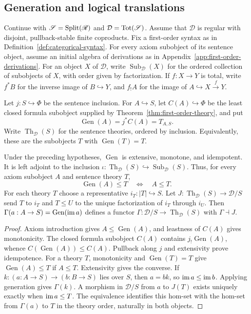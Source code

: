 \subsection{Generation and logical translations}
\label{sec:internal-adjunctions}

Continue with $\mathscr S=\operatorname{Split}(\mathscr R)$ and
$\mathcal D=\operatorname{Tot}(\mathscr S)$. Assume that $\mathcal D$ is regular
with disjoint, pullback-stable finite coproducts. Fix a first-order
syntax as in Definition~\ref{def:categorical-syntax}. For every
axiom subobject of its sentence object, assume an initial algebra
of derivations as in Appendix~\ref{app:first-order-derivations}. For an object $X$ of $\mathcal D$, write
$\operatorname{Sub}_{\mathcal D}(X)$ for the ordered collection of
subobjects of $X$, with order given by factorization. If
$f:X\to Y$ is total, write $f^*B$ for the inverse image of
$B\hookrightarrow Y$, and $f_!A$ for the image of
$A\hookrightarrow X\xrightarrow{f}Y$.

Let $j:S\hookrightarrow\Phi$ be the sentence inclusion. For
$A\hookrightarrow S$, let $C(A)\hookrightarrow\Phi$ be the least
closed formula subobject supplied by
Theorem~\ref{thm:first-order-theory}, and put
\[
 \operatorname{Gen}(A)=j^*C(A)=T_{A,S}.
\]
Write $\operatorname{Th}_{\mathcal D}(S)$ for the sentence theories,
ordered by inclusion. Equivalently, these are the subobjects $T$ with
$\operatorname{Gen}(T)=T$.

\begin{theorem}\label{thm:first-order-reflection}
Under the preceding hypotheses, $\operatorname{Gen}$ is extensive,
monotone, and idempotent. It is left adjoint to the inclusion
$\iota:\operatorname{Th}_{\mathcal D}(S)\hookrightarrow
\operatorname{Sub}_{\mathcal D}(S)$. Thus, for every axiom
subobject $A$ and sentence theory $T$,
\[
 \operatorname{Gen}(A)\leq T\quad\Longleftrightarrow\quad A\leq T.
\]
For each theory $T$ choose a representative $i_T:|T|\hookrightarrow S$.
Let $J:\operatorname{Th}_{\mathcal D}(S)\to\mathcal D/S$ send $T$
to $i_T$ and $T\leq U$ to the unique factorization of $i_T$ through $i_U$. Then
$\Gamma(a:A\to S)=\operatorname{Gen}(\operatorname{im} a)$ defines a functor
$\Gamma:\mathcal D/S\to\operatorname{Th}_{\mathcal D}(S)$ with
$\Gamma\dashv J$.
\end{theorem}
\begin{proof}
Axiom introduction gives $A\leq\operatorname{Gen}(A)$, and
leastness of $C(A)$ gives monotonicity. The closed formula
subobject $C(A)$ contains $j_!\operatorname{Gen}(A)$, whence
$C(\operatorname{Gen}(A))\leq C(A)$. Pullback along $j$ and
extensivity prove idempotence. For a theory $T$, monotonicity and $\operatorname{Gen}(T)=T$ give
$\operatorname{Gen}(A)\leq T$ if $A\leq T$. Extensivity gives the converse. If $k:(a:A\to S)\to(b:B\to S)$ lies over $S$, then $a=bk$,
so $\operatorname{im} a\leq\operatorname{im} b$. Applying generation gives $\Gamma(k)$.
A morphism in $\mathcal D/S$ from $a$ to $J(T)$ exists uniquely
exactly when $\operatorname{im} a\leq T$.
The equivalence identifies this hom-set with the hom-set from
$\Gamma(a)$ to $T$ in the theory order, naturally in both objects.
\end{proof}

